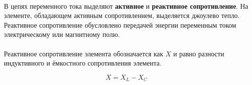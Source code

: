\documentclass[dvipdfmx]{article}
\begin{document}
\paragraph{}
\noindent\makebox[\linewidth][c]{\rule{\linewidth}{0.4pt}}
\paragraph{}

\noindent{}

\paragraph{}
\noindent\makebox[\linewidth][c]{\rule{\linewidth}{0.4pt}}
\paragraph{}

В цепях переменного тока выделяют \textbf{активное} и \textbf{реактивное сопротивление}.
На элементе, обладающем активным сопротивлением, выделяется джоулево тепло.
Реактивное сопротивление обусловлено передачей энергии переменным током электрическому или магнитному полю.

\paragraph{}

Реактивное сопротивление элемента обозначается как $X$ и равно разности индуктивного и ёмкостного сопротивления
элемента.

\begin{equation*}
  X = X_L - X_C
\end{equation*}
\end{document}

